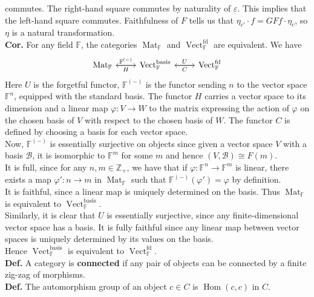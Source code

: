 \documentclass[a4paper]{article}
\theoremstyle{plain}%
\theoremstyle{definition}
\theoremstyle{remark}
\DeclareMathOperator{\Hom}{Hom}
\DeclareMathOperator{\Vect}{Vect}
\DeclareMathOperator{\Mat}{Mat}
\begin{document}
 commutes. The right-hand square commutes by naturality of $\varepsilon$. This
 implies that the left-hand square commutes. Faithfulness of $F$ tells us that
 $\eta_{c'} \cdot  f = GFf \cdot \eta_{c}$, so $\eta$ is a natural
 transformation.\\
 \linebreak
\textbf{Cor. } For any field $\mathbb{F}$, the categories $\Mat_{\mathbb{F}}$
and
$\Vect_{\mathbb{F}}^{\text{fd}}$ are equivalent.
We have
\begin{equation*}
\begin{tikzcd}
    \Mat_{\mathbb{F}} \ar[r, "\mathbb{F}^{(-)}"] & \ar[l, "H"]
    \Vect_{\mathbb{F}}^{\text{basis}} \ar[r, "U"] & \ar[l, "C"]
    \Vect_{\mathbb{F}}^{\text{fd}} 
\end{tikzcd}
\end{equation*}
Here $U$ is the forgetful functor, $\mathbb{F}^{(-)}$ is the functor sending
$n$ to the vector space $\mathbb{F}^{n}$, equipped with the standard basis. The
functor $H$ carries a vector space to its dimension and a linear map
$\varphi  \colon V \to W$ to the matrix expressing the action of $\varphi$ on
the chosen basis of $V$ with respect to the chosen basis of $W$.
The functor $C$ is defined by choosing a basis for each vector space.\\
\linebreak
Now,
$\mathbb{F}^{(-)}$ is essentially surjective on objects since given a vector
space $V$ with a basis $\mathcal{B}$, it is isomorphic to $\mathbb{F}^{m}$ for
some $m$ and hence
$(V, \mathcal{B}) \cong F(m)$.\\
It is full, since for any $n,m \in \mathbb{Z}_{+}$, we have
that if $\varphi  \colon \mathbb{F}^{n} \to \mathbb{F}^{m}$ is linear, there
exists a map $\varphi'  \colon n \to m$ in $\Mat_{\mathbb{F}}$ such that
$\mathbb{F}^{(-)}(\varphi') = \varphi$ by definition.\\
It is faithful, since a linear map is uniquely determined on the basis. Thus
$\Mat_{\mathbb{F}}$ is equivalent to $\Vect_{\mathbb{F}}^{\text{basis}}$.\\
Similarly, it is clear that $U$ is essentially surjective, since any
finite-dimensional vector space has a basis. It is fully faithful since
any linear map between vector spaces is uniquely determined by its values on
the basis.\\
Hence $\Vect_{\mathbb{F}}^{\text{basis}}$ is equivalent to
$\Vect_{\mathbb{F}}^{\text{fd}}$.\\
\linebreak
\textbf{Def.} A category is \textbf{connected} if any pair of objects can be
connected by a finite zig-zag of morphisms.\\
\linebreak
\textbf{Def.} The automorphism group of an object $c \in C$ is 
$\Hom(c,c)$ in $C$.\\
\linebreak
\end{document}
